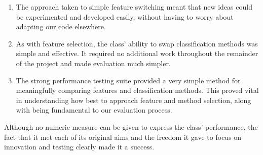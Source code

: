 \begin{enumerate}
	\item The approach taken to simple feature switching meant that new ideas could be experimented and developed easily, without having to worry about adapting our code elsewhere.
	\item As with feature selection, the class' ability to swap classification methods was simple and effective. It required no additional work throughout the remainder of the project and made evaluation much simpler.
	\item The strong performance testing suite provided a very simple method for meaningfully comparing features and classification methods. This proved vital in understanding how best to approach feature and method selection, along with being fundamental to our evaluation process.
\end{enumerate}

Although no numeric measure can be given to express the class' performance, the fact that it met each of its original aims and the freedom it gave to focus on innovation and testing clearly made it a success.

